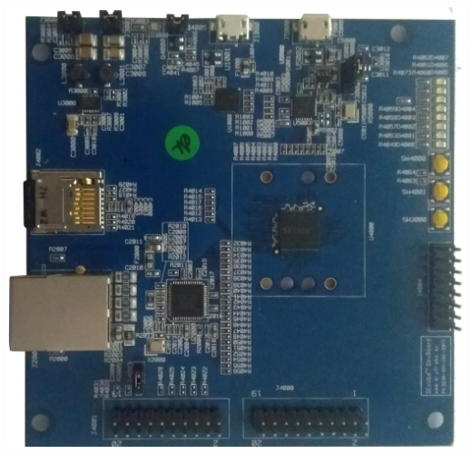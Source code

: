 \documentclass[14pt,usenames,dvipsnames]{beamer}
\begin{document}
\begin{frame}
\begin{columns}
      \includegraphics[width=\columnwidth]{devboard}
  \end{columns}
\end{frame}
\end{document}
